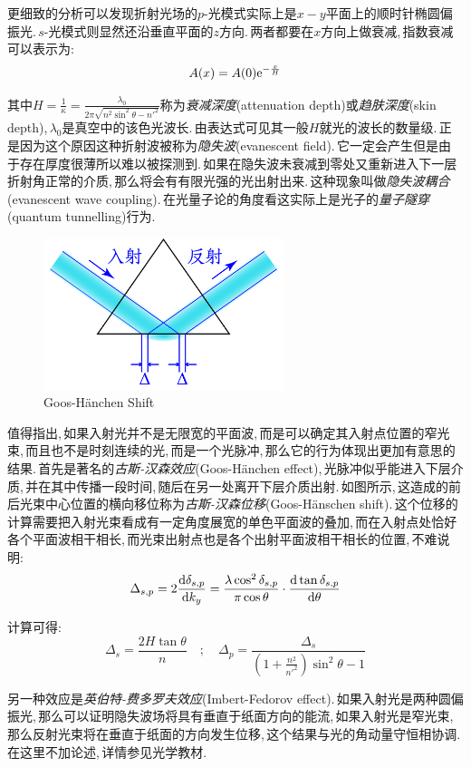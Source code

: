更细致的分析可以发现折射光场的$p$-光模式实际上是$x-y$平面上的顺时针椭圆偏振光.\,$s$-光模式则显然还沿垂直平面的$z$方向.\,两者都要在$x$方向上做衰减,\,指数衰减可以表示为:
\[A(x)=A(0){\rm e}^{-\frac{x}{H}}\]

其中\(\displaystyle H=\frac{1}{\kappa}=\frac{\lambda_0}{2\pi\sqrt{n^2\sin^2\theta-n'^2}}\)称为\emph{衰减深度}(attenuation depth)或\emph{趋肤深度}(skin depth),\,\(\lambda_0\)是真空中的该色光波长.\,由表达式可见其一般$H$就光的波长的数量级.\,正是因为这个原因这种折射波被称为\emph{隐失波}(evanescent field).\,它一定会产生但是由于存在厚度很薄所以难以被探测到.\,如果在隐失波未衰减到零处又重新进入下一层折射角正常的介质,\,那么将会有有限光强的光出射出来.\,这种现象叫做\emph{隐失波耦合}(evanescent wave coupling).\,在光量子论的角度看这实际上是光子的\emph{量子隧穿}(quantum tunnelling)行为.

\npg{-3cm}

\begin{figure}
\centering
\includegraphics[width=7cm]{image/5-6-8.png}
\caption{Goos-H\"anchen Shift}
\end{figure}
值得指出,\,如果入射光并不是无限宽的平面波,\,而是可以确定其入射点位置的窄光束,\,而且也不是时刻连续的光,\,而是一个光脉冲,\,那么它的行为体现出更加有意思的结果.\,首先是著名的\emph{古斯-汉森效应}(Goos-H\"anchen effect),\,光脉冲似乎能进入下层介质,\,并在其中传播一段时间,\,随后在另一处离开下层介质出射.\,如图所示,\,这造成的前后光束中心位置的横向移位称为\emph{古斯-汉森位移}(Goos-H\"anschen shift).\,这个位移的计算需要把入射光束看成有一定角度展宽的单色平面波的叠加,\,而在入射点处恰好各个平面波相干相长,\,而光束出射点也是各个出射平面波相干相长的位置,\,不难说明:
\[\Delta_{s,p}=2\frac{\textrm{d} \delta_{s,p}}{\textrm{d} k_y}=\frac{\lambda\cos^2\delta_{s,p}}{\pi\cos\theta}\cdot\frac{\textrm{d} \tan\delta_{s,p}}{\textrm{d} \theta}\]

计算可得:
\[\Delta_s=\frac{2H\tan\theta}{n}\quad;\quad \Delta_p=\frac{\Delta_s}{(1+\frac{n^2}{n'^2})\sin^2\theta-1}\]

另一种效应是\emph{英伯特-费多罗夫效应}(Imbert-Fedorov effect).\,如果入射光是两种圆偏振光,\,那么可以证明隐失波场将具有垂直于纸面方向的能流,\,如果入射光是窄光束,\,那么反射光束将在垂直于纸面的方向发生位移,\,这个结果与光的角动量守恒相协调.\,在这里不加论述,\,详情参见光学教材.








